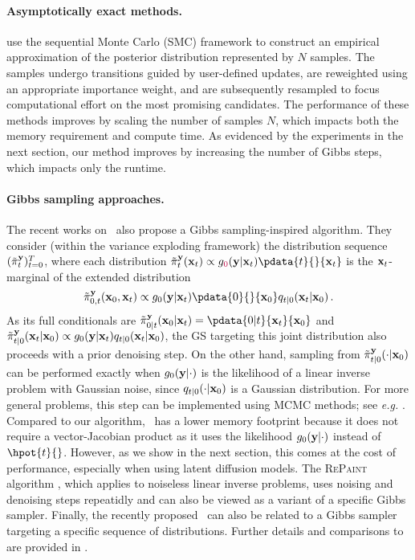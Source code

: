 \paragraph{Asymptotically exact methods.} \citet{trippe2023diffusion,wu2023practical, cardoso2024monte, dou2024diffusion, corenflos2024conditioning,li2024derivative} use the sequential Monte Carlo (SMC) framework to construct an empirical approximation of the posterior distribution represented by $N$ samples. The samples undergo transitions guided by user-defined updates, are reweighted using an appropriate importance weight, and are subsequently resampled to focus computational effort on the most promising candidates. The performance of these methods improves by scaling the number of samples $N$, which impacts both the memory requirement and compute time. As evidenced by the experiments in the next section, our method improves by increasing the number of Gibbs steps, which impacts only the runtime. 

\paragraph{Gibbs sampling approaches.} The recent works \cite{wu2024principled, xu2024provably} on \pnpdm\ also propose a Gibbs sampling-inspired algorithm. They consider (within the variance exploding framework) the distribution sequence $(\tilde{\pi}^{\mathbf{y}} _t)_{t = 0} ^T$, where each distribution $\tilde{\pi}^\obs _t(\bx_t) \propto \pot{\textcolor{purple}{0}}{\bx_t} \pdata{t}{}{\bx_t}$ is the $\mathbf{x}_t$-marginal of the extended distribution 
$$\tilde{\pi}^\obs _{0, t}(\bx_0, \bx_t) \propto \pot{0}{\bx_t} \pdata{0}{}{\bx_0} \fw{t|0}{\bx_0}{\bx_t}\eqsp.$$ 
As its full conditionals are $\smash{\tilde\pi^\obs _{0|t}(\bx_0|\bx_t)} = \pdata{0|t}{\bx_t}{\bx_0}$ and $\tilde\pi^\obs _{t|0}(\bx_t|\bx_0) \propto \pot{0}{\bx_t} \fw{t|0}{\bx_0}{\bx_t}$, the GS targeting this joint distribution also proceeds with a prior denoising step. On the other hand, sampling from $\tilde\pi^{\mathbf{y}} _{t|0}(\cdot|\mathbf{x}_0)$ can be performed exactly when $\pot{0}{}$ is the likelihood of a linear inverse problem with Gaussian noise, since $\fw{t|0}{\bx_0}{\cdot}$ is a Gaussian distribution. For more general problems, this step can be implemented using MCMC methods; see \emph{e.g.} \citep[Algorithms 3 \& 4]{xu2024provably}. Compared to our algorithm, \pnpdm\ has a lower memory footprint because it does not require a vector-Jacobian product as it uses the likelihood $\pot{0}{}$ instead of $\hpot{t}{}$.
However, as we show in the next section, this comes at the cost of performance, especially when using latent diffusion models. The \textsc{RePaint} algorithm \cite{lugmayr2022repaint}, which applies to noiseless linear inverse problems, uses noising and denoising steps repeatidly and can also be viewed as a variant of a specific Gibbs sampler. Finally, the recently proposed \daps\, \cite{zhang2024improving} can also be related to a Gibbs sampler targeting a specific sequence of distributions. Further details and comparisons to {\algo} are provided in .

